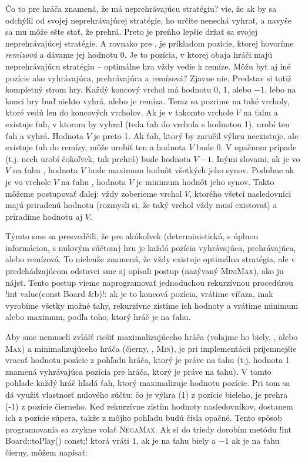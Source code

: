 Čo to pre hráča \crossinl znamená, že \noughtinl má neprehrávajúcu stratégiu?
\crossinl vie, že ak by sa odchýlil od svojej neprehrávajúcej stratégie, \noughtinl 
ho určite nenechá vyhrať, a navyše sa mu môže ešte stať, že prehrá. Preto je preňho lepšie
držať sa svojej neprehrávajúcej stratégie. A rovnako pre \noughtinl. 
je príkladom pozície, ktorej hovoríme {\em remízová} a dávame jej hodnotu 0. Je to pozícia,
v ktorej obaja hráči majú neprehrávajúcu stratégiu -- optimálne hra vždy vedie k remíze.
Môžu byť aj iné pozície ako vyhrávajúca, prehrávajúca a remízová? 
Zjavne nie. Predstav si totiž kompletný strom hry. Každý koncový vrchol má hodnotu $0$, $1$, alebo $-1$,
lebo na konci hry buď niekto vyhrá, alebo je remíza. Teraz sa pozrime na také vrcholy, 
ktoré vedú len do koncových vrcholov. Ak je v takomto vrchole $V$ na ťahu \crossinl a existuje
ťah, v ktorom by vyhral (teda ťah do vrchola s hodnotou 1), \crossinl urobí ten ťah a vyhrá.
Hodnota $V$ je preto 1. Ak ťah, ktorý by \crossinl zaručil výhru neexistuje, ale existuje
ťah do remízy, \crossinl môže urobiť ten a hodnota $V$ bude 0. V opačnom prípade (t.j. nech \crossinl
urobí čokoľvek, tak prehrá) bude hodnota $V$ $-1$. Inými slovami, ak je vo $V$ na ťahu \crossinl,
hodnota $V$ bude maximum hodnôt všetkých jeho synov. Podobne ak je vo vrchole $V$ na ťahu \noughtinl,
hodnota $V$ je minimum hodnôt jeho synov. Takto môžeme postupovať ďalej: vždy zoberieme vrchol $V$,
ktorého všetci nasledovníci majú priradenú hodnotu (rozmysli si, že taký vrchol vždy musí existovať) 
a priradíme hodnotu aj $V$. 

 
Týmto sme sa presvedčili, že pre akúkoľvek (deterministickú, s úplnou informáciou, s nulovým súčtom) 
hru je každá pozícia vyhrávajúca, prehrávajúca, alebo remízová. To nielenže znamená, 
že vždy existuje optimálna
stratégia, ale v predchádzajúcom odstavci sme aj opísali postup (nazývaný {\scshape MiniMax}), ako
ju nájsť. Tento postup vieme naprogramovať jednoduchou rekurzívnou procedúrou \prg!int value(const Board &b)!:
ak je to koncová pozícia, vrátime víťaza, inak vyrobíme všetky možné ťahy, rekurzívne zistíme ich hodnoty a
vrátime minimum alebo maximum, podľa toho, ktorý hráč je na ťahu.

Aby sme nemuseli
zvlášť riešiť maximalizujúceho hráča (volajme ho biely, \crossinl, alebo {\scshape Max}) a minimalizujúceho
hráča (čierny, \noughtinl, {\scshape Min}), je pri implementácii príjemnejšie vracať hodnotu pozície z pohľadu hráča, 
ktorý je 
práve na ťahu (t.j. hodnota 1 znamená vyhrávajúca pozícia pre hráča, ktorý je práve na ťahu). 
V tomto pohľade každý hráč hľadá ťah, ktorý maximalizuje hodnotu pozície. 
Pri tom sa dá využiť vlastnosť nulového súčtu: čo je výhra (1) z pozície bieleho, je prehra
(-1) z pozície čierneho. Keď rekurzívne zistím hodnoty nasledovníkov, dostanem ich z pozície súpera, takže 
z môjho pohľadu budú čísla opačné. Tento spôsob programovania sa zvykne volať {\scshape NegaMax}.
Ak si do triedy  dorobím metódu \prg!int Board::toPlay() const;!
ktorá vráti $1$, ak je na ťahu biely a $-1$ ak je na ťahu čierny, môžem napísať:

